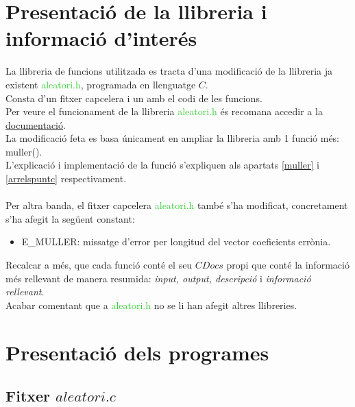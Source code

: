 \documentclass[a4paper, 11pt]{article}
\begin{document}
\section{Presentació de la llibreria i informació d'interés}
La llibreria de funcions utilitzada es tracta d'una modificació de la llibreria ja existent \textcolor{LimeGreen}{aleatori.h}, programada en llenguatge $C$.\\
Consta d'un fitxer capcelera i un amb el codi de les funcions.\\
Per veure el funcionament de la llibreria \textcolor{LimeGreen}{aleatori.h} és recomana accedir a la  \textcolor{blue}{\href{https://www.overleaf.com/read/nxmjqvcfdtrt}{documentació}}.\\
La modificació feta es basa únicament en ampliar la llibreria amb 1 funció més: \textcolor{funcblue}{muller()}.\\
L'explicació i implementació de la funció s'expliquen als apartats \textcolor{blue}{\ref{muller}} i \textcolor{blue}{\ref{arrelspuntc}} respectivament.\\\\
Per altra banda, el fitxer capcelera \textcolor{LimeGreen}{aleatori.h} també s'ha modificat, concretament s'ha afegit la següent constant:
\begin{itemize}
    \item \textcolor{Dandelion}{E\_MULLER}: missatge d'error per longitud del vector coeficients errònia.\label{errormuller}
\end{itemize}
Recalcar a més, que cada funció conté el seu $CDocs$ propi que conté la informació més rellevant de manera resumida: \textit{input, output, descripció} i \textit{informació rellevant}.\\
Acabar comentant que a \textcolor{LimeGreen}{aleatori.h} no se li han afegit altres llibreries.\\




\newpage
\section{Presentació dels programes}
\subsection{Fitxer $aleatori.c$}
\end{document}
